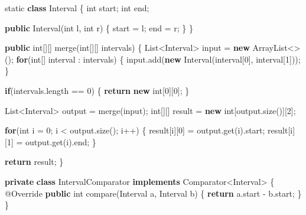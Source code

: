 \documentclass[]{book}
\newenvironment{Shaded}{\begin{snugshade}}{\end{snugshade}}
\newcommand{\AttributeTok}[1]{\textcolor[rgb]{0.77,0.63,0.00}{#1}}
\newcommand{\BuiltInTok}[1]{#1}
\newcommand{\DataTypeTok}[1]{\textcolor[rgb]{0.13,0.29,0.53}{#1}}
\newcommand{\DecValTok}[1]{\textcolor[rgb]{0.00,0.00,0.81}{#1}}
\newcommand{\FunctionTok}[1]{\textcolor[rgb]{0.00,0.00,0.00}{#1}}
\newcommand{\KeywordTok}[1]{\textcolor[rgb]{0.13,0.29,0.53}{\textbf{#1}}}
\newcommand{\NormalTok}[1]{#1}
\begin{document}
\begin{Shaded}
\begin{Highlighting}[]
\DataTypeTok{static} \KeywordTok{class}\NormalTok{ Interval \{}
    \DataTypeTok{int}\NormalTok{ start;}
    \DataTypeTok{int}\NormalTok{ end;}

    \KeywordTok{public} \FunctionTok{Interval}\NormalTok{(}\DataTypeTok{int}\NormalTok{ l, }\DataTypeTok{int}\NormalTok{ r) \{}
\NormalTok{        start = l;}
\NormalTok{        end = r;}
\NormalTok{    \}}
\NormalTok{\}}

\KeywordTok{public} \DataTypeTok{int}\NormalTok{[][] }\FunctionTok{merge}\NormalTok{(}\DataTypeTok{int}\NormalTok{[][] intervals) \{}
    \BuiltInTok{List}\NormalTok{<Interval> input = }\KeywordTok{new} \BuiltInTok{ArrayList}\NormalTok{<>();}
    \KeywordTok{for}\NormalTok{(}\DataTypeTok{int}\NormalTok{[] interval : intervals) \{}
\NormalTok{        input.}\FunctionTok{add}\NormalTok{(}\KeywordTok{new} \FunctionTok{Interval}\NormalTok{(interval[}\DecValTok{0}\NormalTok{], interval[}\DecValTok{1}\NormalTok{]));}
\NormalTok{    \}}

    \KeywordTok{if}\NormalTok{(intervals.}\FunctionTok{length}\NormalTok{ == }\DecValTok{0}\NormalTok{) \{}
        \KeywordTok{return} \KeywordTok{new} \DataTypeTok{int}\NormalTok{[}\DecValTok{0}\NormalTok{][}\DecValTok{0}\NormalTok{];}
\NormalTok{    \}}

    \BuiltInTok{List}\NormalTok{<Interval> output = }\FunctionTok{merge}\NormalTok{(input);}
    \DataTypeTok{int}\NormalTok{[][] result = }\KeywordTok{new} \DataTypeTok{int}\NormalTok{[output.}\FunctionTok{size}\NormalTok{()][}\DecValTok{2}\NormalTok{];}

    \KeywordTok{for}\NormalTok{(}\DataTypeTok{int}\NormalTok{ i = }\DecValTok{0}\NormalTok{; i < output.}\FunctionTok{size}\NormalTok{(); i++) \{}
\NormalTok{        result[i][}\DecValTok{0}\NormalTok{] = output.}\FunctionTok{get}\NormalTok{(i).}\FunctionTok{start}\NormalTok{;}
\NormalTok{        result[i][}\DecValTok{1}\NormalTok{] = output.}\FunctionTok{get}\NormalTok{(i).}\FunctionTok{end}\NormalTok{;}
\NormalTok{    \}}

    \KeywordTok{return}\NormalTok{ result;}
\NormalTok{\}}

\KeywordTok{private} \KeywordTok{class}\NormalTok{ IntervalComparator }\KeywordTok{implements} \BuiltInTok{Comparator}\NormalTok{<Interval> \{}
    \AttributeTok{@Override}
    \KeywordTok{public} \DataTypeTok{int} \FunctionTok{compare}\NormalTok{(Interval a, Interval b) \{}
        \KeywordTok{return}\NormalTok{ a.}\FunctionTok{start}\NormalTok{ - b.}\FunctionTok{start}\NormalTok{;}
\NormalTok{    \}}
\NormalTok{\}}


\end{Highlighting}
\end{Shaded}
\end{document}
